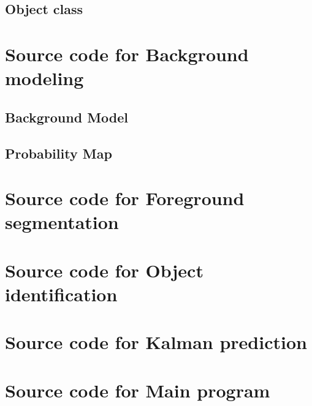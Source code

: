 \documentclass[10pt, a4paper, twoside]{article}
\numberwithin{equation}{subsection}
\numberwithin{figure}{section}
\numberwithin{table}{section}
\begin{document}
\subsection{Object class}
\label{sec:Object_code}

\newpage



\newpage
\section{Source code for Background modeling}
\label{sec:BGMod_code}
\subsection{Background Model}


\newpage
\subsection{Probability Map}
\label{sec:ProbMap_code}

\newpage


\newpage
\section{Source code for Foreground segmentation}
\label{sec:ForeGroundSeg_code}

\newpage


\newpage
\section{Source code for Object identification}
\label{sec:ObjID_code}

\newpage


\newpage
\section{Source code for Kalman prediction}
\label{sec:Kalman_code}

\newpage


\newpage
\section{Source code for Main program}
\label{sec:Main_code}



%
\end{document}
